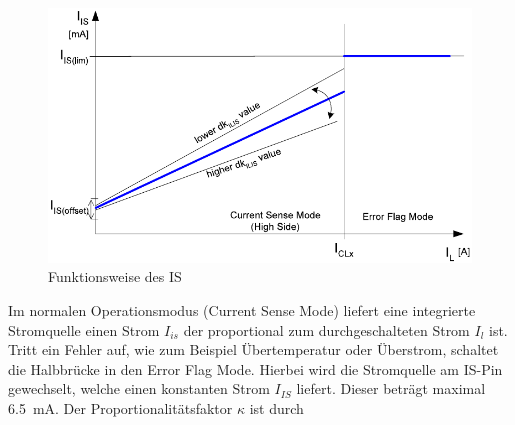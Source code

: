 \begin{figure} [H]
	\centering
	\includegraphics[width=0.7\linewidth]{Bilder/IS_Pin.pdf}
	\caption{Funktionsweise des IS \cite[S.18]{btn}}
	\label{fig:IS_Pin}
\end{figure}\noindent
Im normalen Operationsmodus (Current Sense Mode) liefert eine integrierte Stromquelle einen Strom $I_{is}$ der proportional zum durchgeschalteten Strom $I_{l}$ ist. Tritt ein Fehler auf, wie zum Beispiel Übertemperatur oder Überstrom, schaltet die Halbbrücke in den Error Flag Mode. Hierbei wird die Stromquelle am IS-Pin gewechselt, welche einen konstanten Strom $I_{IS}$ liefert.  Dieser beträgt maximal \SI{6,5}{mA}. Der Proportionalitätsfaktor $\kappa$ ist durch

